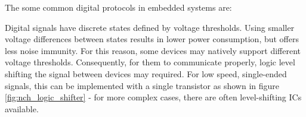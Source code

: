\documentclass[main.tex]{subfiles}
\begin{document}
The some common digital protocols in embedded systems are:
\begin{table}[H]
    \centering
    \caption{Digital Protocol Definitions}
    \label{tab:digital_protocols}
\end{table}

\noindent Digital signals have discrete states defined by voltage thresholds. Using smaller voltage differences between states results in lower power consumption, but offers less noise immunity. For this reason, some devices may natively support different voltage thresholds. Consequently, for them to communicate properly, logic level shifting the signal between devices may required. For low speed, single-ended signals, this can be implemented with a single transistor as shown in figure \ref{fig:nch_logic_shifter} - for more complex cases, there are often level-shifting ICs available. 
\end{document}
